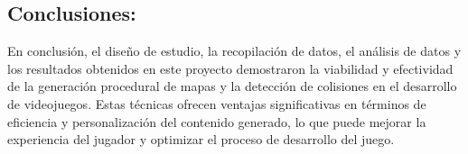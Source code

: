 \documentclass[stu, 12pt, letterpaper, donotrepeattitle, floatsintext, natbib]{apa7}
\newcommand{\myparagraph}[1]{\paragraph{#1}\mbox{}\\}
\begin{document}
\subsection{Conclusiones:}
En conclusión, el diseño de estudio, la recopilación de datos, el análisis de datos y los resultados obtenidos en este proyecto demostraron la viabilidad y efectividad de la generación procedural de mapas y la detección de colisiones en el desarrollo de videojuegos. Estas técnicas ofrecen ventajas significativas en términos de eficiencia y personalización del contenido generado, lo que puede mejorar la experiencia del jugador y optimizar el proceso de desarrollo del juego.
\noindent {}

\newpage
\renewcommand\refname{\large\textbf{Referencias}}

\end{document}
